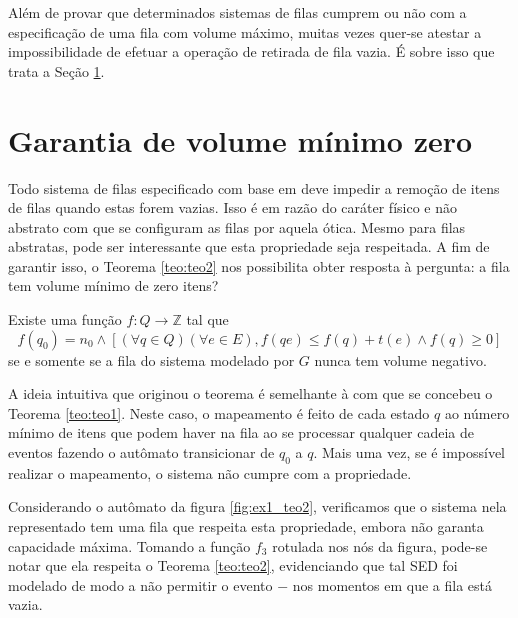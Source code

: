 Além de provar que determinados sistemas de filas cumprem ou não com a especificação de uma fila com volume máximo, muitas vezes quer-se atestar a impossibilidade de efetuar a operação de retirada de fila vazia. É sobre isso que trata a Seção \ref{sec:vol_min}.

\section{Garantia de volume mínimo zero}
\label{sec:vol_min}

Todo sistema de filas especificado com base em  deve impedir a remoção de itens de filas quando estas forem vazias. Isso é em razão do caráter físico e não abstrato com que se configuram as filas por aquela ótica. Mesmo para filas abstratas, pode ser interessante que esta propriedade seja respeitada. A fim de garantir isso, o Teorema \ref{teo:teo2} nos possibilita obter resposta à pergunta: a fila tem volume mínimo de zero itens?

\begin{teo}
	\label{teo:teo2}
	Existe uma função $f : Q \to \mathbb{Z}$ tal que \begin{equation*}
	f(q_0) = n_0 \wedge [(\forall q \in Q)(\forall e \in E), f(qe) \leq f(q) + t(e) \wedge f(q) \geq 0]
	\end{equation*} se e somente se a fila do sistema modelado por $G$ nunca tem volume negativo.
\end{teo}

A ideia intuitiva que originou o teorema é semelhante à com que se concebeu o Teorema \ref{teo:teo1}. Neste caso, o mapeamento é feito de cada estado $q$ ao número mínimo de itens que podem haver na fila ao se processar qualquer cadeia de eventos fazendo o autômato transicionar de $q_0$ a $q$. Mais uma vez, se é impossível realizar o mapeamento, o sistema não cumpre com a propriedade.

Considerando o autômato da figura \ref{fig:ex1_teo2}, verificamos que o sistema nela representado tem uma fila que respeita esta propriedade, embora não garanta capacidade máxima. Tomando a função $f_3$ rotulada nos nós da figura, pode-se notar que ela respeita o Teorema \ref{teo:teo2}, evidenciando que tal SED foi modelado de modo a não permitir o evento $-$ nos momentos em que a fila está vazia.


